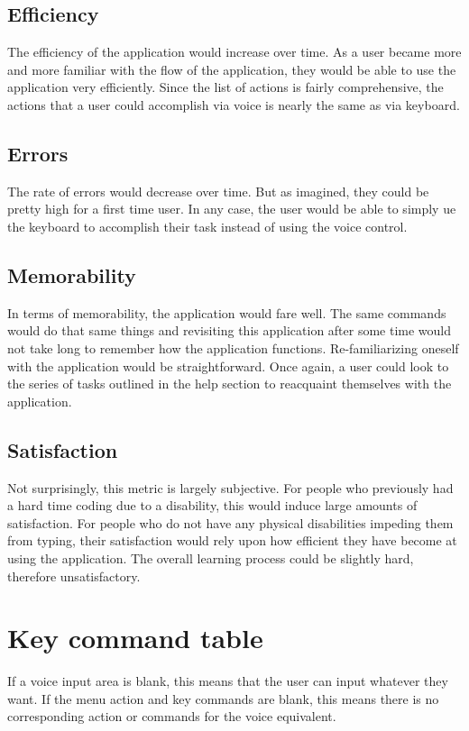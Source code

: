 \documentclass[11pt, oneside]{article}
\begin{document}
\subsection{Efficiency}
The efficiency of the application would increase over time. As a user became more and more familiar with the flow of the application, they would be able to use the application very efficiently. Since the list of actions is fairly comprehensive, the actions that a user could accomplish via voice is nearly the same as via keyboard.

\subsection{Errors}
The rate of errors would decrease over time. But as imagined, they could be pretty high for a first time user. In any case, the user would be able to simply ue the keyboard to accomplish their task instead of using the voice control.

\subsection{Memorability}
In terms of memorability, the application would fare well. The same commands would do that same things and revisiting this application after some time would not take long to remember how the application functions. Re-familiarizing oneself with the application would be straightforward. Once again, a user could look to the series of tasks outlined in the help section to reacquaint themselves with the application.

\subsection{Satisfaction}
Not surprisingly, this metric is largely subjective. For people who previously had a hard time coding due to a disability, this would induce large amounts of satisfaction. For people who do not have any physical disabilities impeding them from typing, their satisfaction would rely upon how efficient they have become at using the application. The overall learning process could be slightly hard, therefore unsatisfactory.

\pagebreak

\section{Key command table}
\label{sec:command_table}
If a voice input area is blank, this means that the user can input whatever they want. If the menu action and key commands are blank, this means there is no corresponding action or commands for the voice equivalent. \vspace{2mm}
\end{document}

